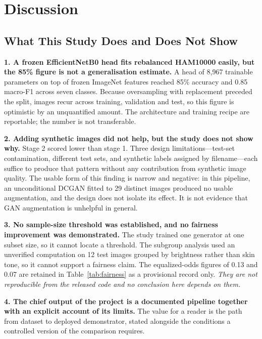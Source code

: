 \documentclass[ai,article,submit,pdftex,moreauthors]{Definitions/mdpi}
\begin{document}
\section{Discussion}

\subsection{What This Study Does and Does Not Show}

\textbf{1. A frozen EfficientNetB0 head fits rebalanced HAM10000 easily, but the 85\% figure is not a generalisation estimate.} A head of 8,967 trainable parameters on top of frozen ImageNet features reached 85\% accuracy and 0.85 macro-F1 across seven classes. Because oversampling with replacement preceded the split, images recur across training, validation and test, so this figure is optimistic by an unquantified amount. The architecture and training recipe are reportable; the number is not transferable.

\textbf{2. Adding synthetic images did not help, but the study does not show why.} Stage 2 scored lower than stage 1. Three design limitations---test-set contamination, different test sets, and synthetic labels assigned by filename---each suffice to produce that pattern without any contribution from synthetic image quality. The usable form of this finding is narrow and negative: in this pipeline, an unconditional DCGAN fitted to 29 distinct images produced no usable augmentation, and the design does not isolate its effect. It is not evidence that GAN augmentation is unhelpful in general.

\textbf{3. No sample-size threshold was established, and no fairness improvement was demonstrated.} The study trained one generator at one subset size, so it cannot locate a threshold. The subgroup analysis used an unverified computation on 12 test images grouped by brightness rather than skin tone, so it cannot support a fairness claim. The equalized-odds figures of 0.13 and 0.07 are retained in Table~\ref{tab:fairness} as a provisional record only. \textit{They are not reproducible from the released code and no conclusion here depends on them.}

\textbf{4. The chief output of the project is a documented pipeline together with an explicit account of its limits.} The value for a reader is the path from dataset to deployed demonstrator, stated alongside the conditions a controlled version of the comparison requires.
\end{document}
